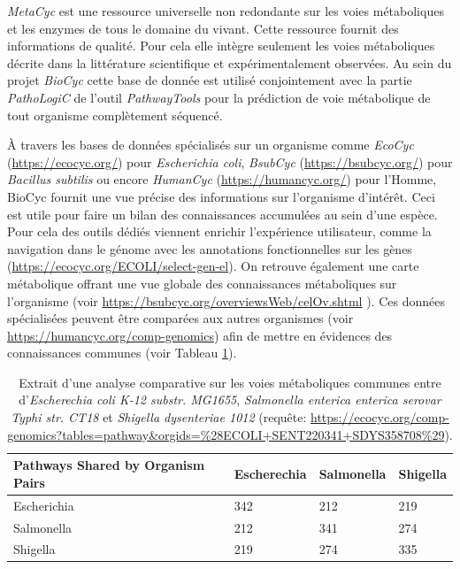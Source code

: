 \begin{refsegment}
    \textit{MetaCyc} \cite{Karp2011,caspi2013metacyc,caspi2016metacyc} est une ressource universelle non redondante sur les voies métaboliques et les enzymes de tous le domaine du vivant. Cette ressource fournit des informations de qualité. Pour cela elle intègre seulement les voies métaboliques décrite dans la littérature scientifique et expérimentalement observées. Au sein du projet \textit{BioCyc} cette base de donnée est utilisé conjointement avec la partie \textit{PathoLogiC} de l'outil \textit{PathwayTools} pour la prédiction de voie métabolique de tout organisme complètement séquencé. 
    
    À travers les bases de données spécialisés sur un organisme comme \textit{EcoCyc} (\url{https://ecocyc.org/}) pour \textit{Escherichia coli}, \textit{BsubCyc} (\url{https://bsubcyc.org/}) pour \textit{Bacillus subtilis} ou encore \textit{HumanCyc} (\url{https://humancyc.org/}) pour l'Homme, BioCyc fournit une vue précise des informations sur l'organisme d'intérêt. Ceci est utile pour faire un bilan des connaissances accumulées au sein d'une espèce. Pour cela des outils dédiés viennent enrichir l'expérience utilisateur, comme la navigation dans le génome avec les annotations fonctionnelles sur les gènes (\url{https://ecocyc.org/ECOLI/select-gen-el}). On retrouve également une carte métabolique offrant une vue globale des connaissances métaboliques sur l'organisme (voir \url{https://bsubcyc.org/overviewsWeb/celOv.shtml} ). Ces données spécialisées peuvent être comparées aux autres organismes  (voir \url{https://humancyc.org/comp-genomics}) afin de mettre en évidences des connaissances communes (voir Tableau \ref{tab:compare_tools}).
    
    \begin{table}[H]
    	\caption{Extrait d'une analyse comparative sur les voies métaboliques communes entre d'\textit{Escherechia coli K-12 substr. MG1655}, \textit{Salmonella enterica enterica serovar Typhi str. CT18} et \textit{Shigella dysenteriae 1012} (requête: \url{https://ecocyc.org/comp-genomics?tables=pathway&orgids=\%28ECOLI+SENT220341+SDYS358708\%29}). }
    	\label{tab:compare_tools} 
    	\begin{tabular}{l|lll}
    		\toprule
    		Pathways Shared by Organism Pairs & Escherechia & Salmonella & Shigella \\
    		\midrule
    		Escherichia                       & 342         & 212        & 219      \\           
    		Salmonella                        & 212         & 341        & 274      \\           
    		Shigella                          & 219         & 274        & 335      \\ 
    		\bottomrule
    	\end{tabular}
    \end{table}
    

\end{refsegment}
